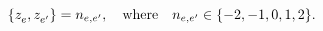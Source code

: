\begin{equation}\label{poisson}
\{z_{e}^{},z_{e'}^{}\}=n_{e,e'}, \quad{\rm where}\quad
n_{e,e'}\in\{-2,-1,0,1,2\}.
\end{equation}

